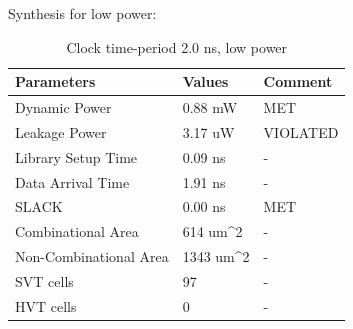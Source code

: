 \documentclass[11pt,a4paper]{article}
\begin{document}
Synthesis for low power:

\begin{table}[htbp]
\begin{center}
\begin{tabular}{|l|l|l|}
\hline
\textbf{Parameters}	& \textbf{Values}		& \textbf{Comment}\\ \hline
Dynamic Power				&	0.88 mW				& MET\\ \hline
Leakage Power 			&	3.17 uW				& VIOLATED\\ \hline
Library Setup Time  & 0.09 ns				& - \\ \hline
Data Arrival Time		& 1.91 ns				& - \\ \hline
SLACK								& 0.00 ns			& MET\\ \hline
Combinational Area	& 614 um^2			& - \\ \hline
Non-Combinational Area	& 1343 um^2	& - \\ \hline
SVT cells						& 97						& - \\ \hline
HVT cells						& 0							& - \\ \hline
\end{tabular}
\end{center}
\caption{Clock time-period 2.0 ns, low power}
\label{tab:syn2.0.2}
\end{table}

\newpage
\end{document}
